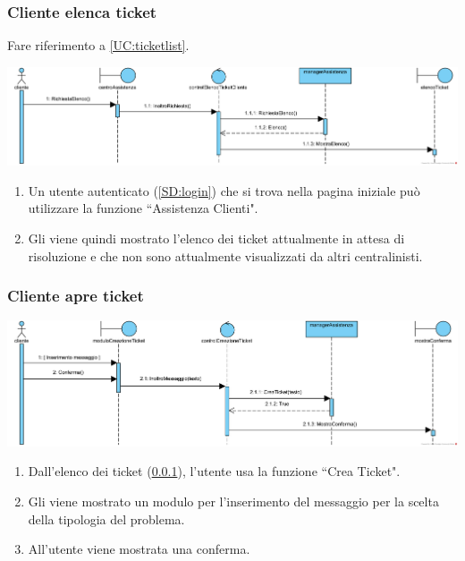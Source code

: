 \documentclass[12pt,a4paper]{article}
\begin{document}
\newpage

\subsubsection{Cliente elenca ticket}
\label{SD:elencoticket}
Fare riferimento a \ref{UC:ticketlist}. \\

\begin{center}
\includegraphics[width=\textwidth]{SequenceDiagram/ClienteTicketElenco}
\end{center}

\begin{enumerate}
\item Un utente autenticato (\ref{SD:login}) che si trova nella pagina iniziale può utilizzare la funzione ``Assistenza Clienti".
\item Gli viene quindi mostrato l'elenco dei ticket attualmente in attesa di risoluzione e che non sono attualmente visualizzati da altri centralinisti.
\end{enumerate}

\subsubsection{Cliente apre ticket}
\label{SD:aperturaticket}

\begin{center}
\includegraphics[clip,width=\textwidth]{SequenceDiagram/ClienteTicketCreazione}
\end{center}

\begin{enumerate}
\item Dall'elenco dei ticket (\ref{SD:elencoticket}), l'utente usa la funzione ``Crea Ticket".
\item Gli viene mostrato un modulo per l'inserimento del messaggio per la scelta della tipologia del problema.
\item All'utente viene mostrata una conferma.
\end{enumerate}
\end{document}
